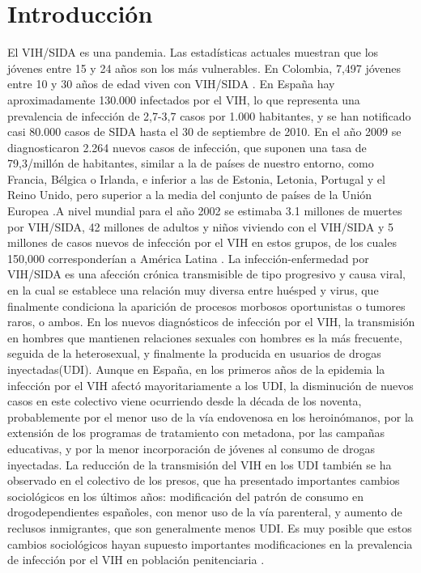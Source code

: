 \documentclass[a4paper,twocolumn,10pt]{article}
\begin{document}
\section{Introducción}
El VIH/SIDA es una pandemia. Las estadísticas actuales muestran que los jóvenes entre 15 y 24 años son los más vulnerables. En Colombia, 7,497 jóvenes entre 10 y 30 años de edad viven con VIH/SIDA \cite{LinaMariaVera2004}. En España hay aproximadamente 130.000 infectados por el VIH, lo que representa una prevalencia de infección de 2,7-3,7 casos por 1.000 habitantes, y se han notificado casi 80.000 casos de SIDA hasta el 30 de septiembre de 2010. En el año 2009 se diagnosticaron 2.264 nuevos casos de infección, que suponen una tasa de 79,3/millón de habitantes, similar a la de países de nuestro entorno, como Francia, Bélgica o Irlanda, e inferior a las de Estonia, Letonia, Portugal y el Reino Unido, pero superior a la media del conjunto de países de la Unión Europea \cite{Marco2012}.A nivel mundial para el año 2002 se estimaba 3.1 millones de muertes por VIH/SIDA, 42 millones de adultos y niños viviendo con el VIH/SIDA y 5 millones de casos nuevos de infección por el VIH en estos grupos, de los cuales 150,000 corresponderían a América Latina \cite{LinaMariaVera2004}. \newline \newline
La infección-enfermedad por VIH/SIDA es una afección crónica transmisible de tipo progresivo y causa viral, en la cual se establece una relación muy diversa entre huésped y virus, que finalmente condiciona la aparición de procesos morbosos oportunistas o tumores raros, o ambos\cite{Castillo2004}. \newline \newline
En los nuevos diagnósticos de infección por el VIH, la transmisión en hombres que mantienen relaciones sexuales con hombres es la más frecuente, seguida de la heterosexual, y finalmente la producida en usuarios de drogas inyectadas(UDI). Aunque en España, en los primeros años de la epidemia la infección por el VIH afectó mayoritariamente a los UDI, la disminución de nuevos casos en este colectivo viene ocurriendo desde la década de los noventa, probablemente por el menor uso de la vía endovenosa en los heroinómanos, por la extensión de los programas de tratamiento con metadona, por las campañas educativas, y por la menor incorporación de jóvenes al consumo de drogas inyectadas. La reducción de la transmisión del VIH en los UDI también se ha observado en el colectivo de los presos, que ha presentado importantes cambios sociológicos en los últimos años: modificación del patrón de consumo en drogodependientes españoles, con menor uso de la vía parenteral, y aumento de reclusos inmigrantes, que son generalmente menos UDI. Es muy posible que estos cambios sociológicos hayan supuesto importantes modificaciones en la prevalencia de infección por el VIH en población penitenciaria \cite{Marco2012}. \newline \newline
\end{document}
